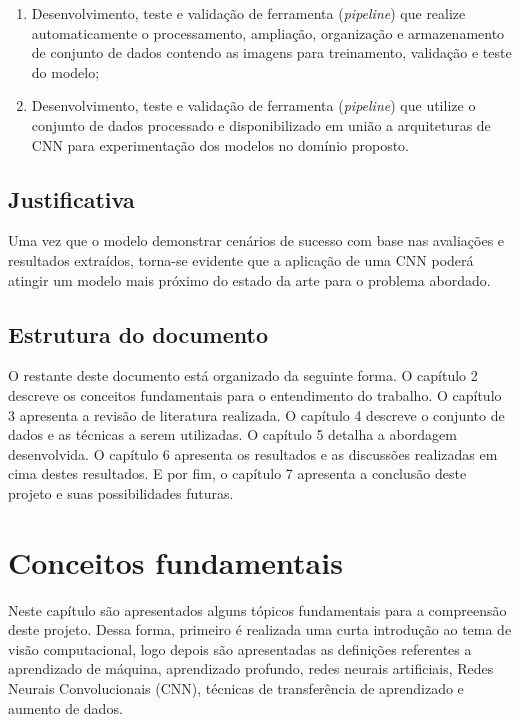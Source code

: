 \documentclass[
	12pt,				%
	oneside,			%
	a4paper,			%
	english,			%
	brazil				%
	]{abntex2ppgsi}
\begin{document}
\begin{enumerate}
  \item Desenvolvimento, teste e validação de ferramenta (\textit{pipeline}) que realize automaticamente o processamento, ampliação, organização e armazenamento de conjunto de dados contendo as imagens para treinamento, validação e teste do modelo;
  \item Desenvolvimento, teste e validação de ferramenta (\textit{pipeline}) que utilize o conjunto de dados processado e disponibilizado em união a arquiteturas de CNN para experimentação dos modelos no domínio proposto.
\end{enumerate}

\section{Justificativa}
Uma vez que o modelo demonstrar cenários de sucesso com base nas avaliações e resultados extraídos, torna-se evidente que a aplicação de uma CNN poderá atingir um modelo mais próximo do estado da arte para o problema abordado.

\section{Estrutura do documento}
O restante deste documento está organizado da seguinte forma. O capítulo 2 descreve os conceitos fundamentais para o entendimento do trabalho. O capítulo 3 apresenta a revisão de literatura realizada. O capítulo 4 descreve o conjunto de dados e as técnicas a serem utilizadas. O capítulo 5 detalha a abordagem desenvolvida. O capítulo 6 apresenta os resultados e as discussões realizadas em cima destes resultados. E por fim, o capítulo 7 apresenta a conclusão deste projeto e suas possibilidades futuras.

\chapter{Conceitos fundamentais}
Neste capítulo são apresentados alguns tópicos fundamentais para a compreensão deste projeto. Dessa forma, primeiro é realizada uma curta introdução ao tema de visão computacional, logo depois são apresentadas as definições referentes a aprendizado de máquina, aprendizado profundo, redes neurais artificiais, Redes Neurais Convolucionais (CNN), técnicas de transferência de aprendizado e aumento de dados.
\end{document}
